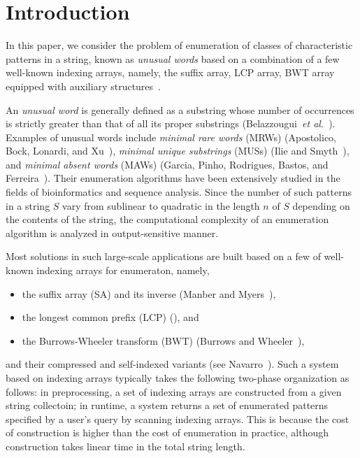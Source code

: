 
\section{Introduction}
\label{sec:intro}

In this paper, we consider the problem of enumeration of classes of characteristic patterns in a string, known as \textit{unusual words} based on a combination of a few well-known indexing arrays, namely,
the suffix array, LCP array, BWT array equipped with auxiliary structures~\cite{manber:myers1993suffixarrays,burrows:wheeler1994blocksorting}.

An \textit{unusual word} is generally defined as a substring whose number of occurrences is strictly greater than that of all its proper substrings (Belazzougui~\textit{et al.}~\cite{belazzougui:cunial:gagie:prezza:raffinot2015composite}).
Examples of unusual words include \textit{minimal rare words} (MRWs) (Apostolico, Bock, Lonardi, and Xu~\cite{apostolico2000efficient}), \textit{minimal unique substrings} (MUSs) (Ilie and Smyth~\cite{ilie2011minimum}), and \textit{minimal absent words} (MAWs) (Garcia, Pinho, Rodrigues, Bastos, and Ferreira~\cite{garcia2011minimal}).
Their enumeration algorithms have been extensively studied in the fields of bioinformatics and sequence analysis.
Since the number of such patterns in a string $S$ vary from sublinear to quadratic in the length $n$ of $S$ depending on the contents of the string, the computational complexity of an enumeration algorithm is analyzed in output-sensitive manner. 

Most solutions in such large-scale applications are built based on a few of well-known indexing arrays for enumeraton, namely,
\begin{itemize}
\item the suffix array (SA) and its inverse (Manber and Myers~\cite{manber:myers1993suffixarrays}),
\item the longest common prefix (LCP) (\cite{manber:myers1993suffixarrays}), and
\item the Burrows-Wheeler transform (BWT) (Burrows and Wheeler~\cite{burrows:wheeler1994blocksorting}), 
\end{itemize}
and their compressed and self-indexed variants (see Navarro~\cite{navarro2016cds:book}). 
Such a system based on indexing arrays typically takes the following two-phase organization as follows: in preprocessing, a set of indexing arrays are constructed from a given string collectoin; in runtime, a system returns a set of enumerated patterns specified by a user's query by scanning indexing arrays. This is because the cost of construction is higher than the cost of enumeration in practice, although construction takes linear time in the total string length. 

